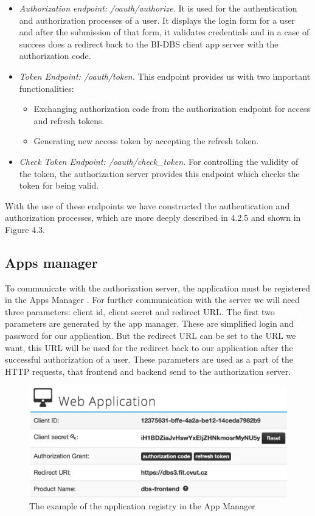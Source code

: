 \begin{itemize}
    \item \emph{Authorization endpoint: /oauth/authorize.} It is used for the authentication and authorization processes of a user. It displays the login form for a user and after the submission of that form, it validates credentials and in a case of success does a redirect back to the BI-DBS client app server with the authorization code. 
    \item \emph{Token Endpoint: /oauth/token.} This endpoint provides us with two important functionalities:
        \begin{itemize}
            \item Exchanging authorization code from the authorization endpoint for access and refresh tokens.
            \item Generating new access token by accepting the refresh token.
        \end{itemize}
   \item \emph{Check Token Endpoint: /oauth/check\_token.} For controlling the validity of the token, the authorization server provides this endpoint which checks the token for being valid.
\end{itemize}

\noindent With the use of these endpoints we have constructed the authentication and authorization processes, which are more deeply described in 4.2.5 and shown in Figure 4.3.


\subsection{Apps manager} To communicate with the authorization server, the application must be registered in the Apps Manager \cite{app-manager}. For further communication with the server we will need three parameters: client id, client secret and redirect URL. The first two parameters are generated by the app manager. These are simplified login and password for our application. But the redirect URL can be set to the URL we want, this URL will be used for the redirect back to our application after the successful authorization of a user. These parameters are used as a part of the HTTP requests, that frontend and backend send to the authorization server. 

\begin{figure}[hp]
\centering
\includegraphics[scale=0.52]{../png/app_manager.png}
\caption{The example of the application registry in the App Manager \cite{app-manager}}
\end{figure}


